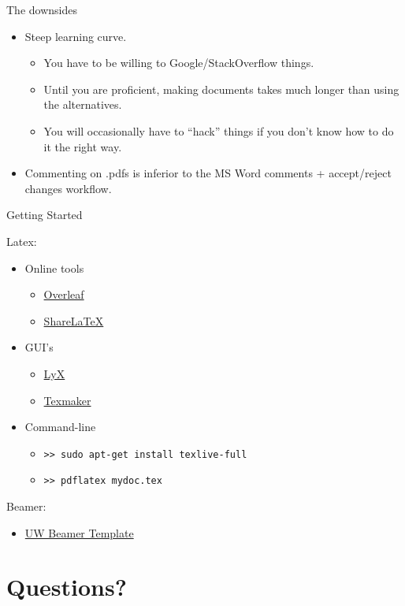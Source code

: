 \documentclass[12pt]{beamer}
\begin{document}
\begin{frame}{The downsides}

\begin{itemize}
\item Steep learning curve.
\begin{itemize}
\item You have to be willing to Google/StackOverflow things.
\item Until you are proficient, making documents takes much longer than using the alternatives.
\item You will occasionally have to ``hack'' things if you don't know how to do it the right way.
\end{itemize}
\item Commenting on .pdfs is inferior to the MS Word comments + accept/reject changes workflow.
\end{itemize}

\end{frame}

\begin{frame}{Getting Started}

Latex:
\begin{itemize}
\item{Online tools}
\begin{itemize}
\item \href{https://www.overleaf.com/}{Overleaf }
\item \href{https://www.sharelatex.com/}{ShareLaTeX }
\end{itemize}

\item{GUI's}
\begin{itemize}
\item \href{http://www.lyx.org/}{LyX }
\item \href{http://www.xm1math.net/texmaker/}{Texmaker }
\end{itemize}

\item{Command-line}
\begin{itemize}
\item \texttt{>> sudo apt-get install texlive-full}
\item \texttt{>> pdflatex mydoc.tex}
\end{itemize}

\end{itemize}
Beamer:
\begin{itemize}
\item \href{https://github.com/travitch/uw-beamer-template}{UW Beamer Template }
\end{itemize}

\end{frame}
\section*{Questions?}
\end{document}
